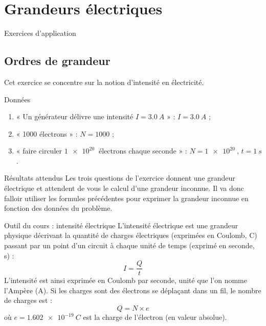 \documentclass[../main/main.tex]{subfiles}
\begin{document}
\chapter{Grandeurs électriques}\label{ch:O1}

\begin{center}
    \Huge Exercices d'application
\end{center}

\section{Ordres de grandeur}

Cet exercice se concentre sur la notion d'intensité en électricité.

\begin{NCdefi}{Données}
	\begin{enumerate}
        \item « Un générateur délivre une intensité $I = \SI{3.0}{A}$ » :
            $I = \SI{3.0}{A}$ ;
		\item « 1000 électrons » : $N = 1000$ ;
        \item « faire circuler $\SI{1e20}{}$ électrons chaque seconde » : $N =
            \SI{1e20}{}$, $t = \SI{1}{s}$.
	\end{enumerate}
\end{NCdefi}

\begin{NCprop}{Résultats attendus}
    Les trois questions de l'exercice donnent une grandeur électrique et
    attendent de vous le calcul d'une grandeur inconnue. Il va donc falloir
    utiliser les formules précédentes pour exprimer la grandeur inconnue en
    fonction des données du problème.
\end{NCprop}

\begin{NCdemo}{Outil du cours : intensité électrique}
    L'intensité électrique est une grandeur physique décrivant la quantité de
    charges électriques (exprimées en Coulomb, C) passant par un point d'un
    circuit à chaque unité de temps (exprimé en seconde, s) :
	\begin{equation}
		I = \dfrac{Q}{t} \label{eq:1.1.intensite}
	\end{equation}
    L'intensité est ainsi exprimée en Coulomb par seconde, unité que l'on nomme
    l'Ampère (A). Si les charges sont des électrons se déplaçant dans un fil, le
    nombre de charges est :
	\begin{equation}
		Q = N\times e \label{eq:1.1.charge}
	\end{equation}
    où $e = \SI{1.602e-19}{C}$ est la charge de l'électron (en valeur
    absolue).
\end{NCdemo}
\end{document}
